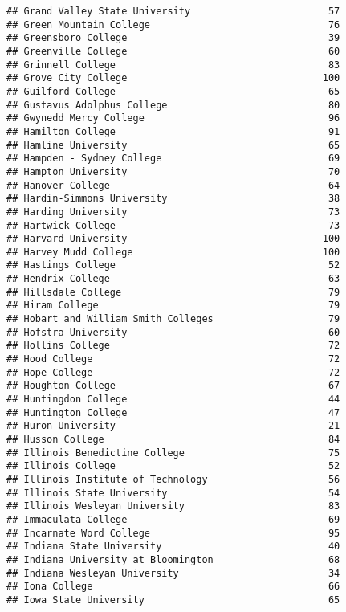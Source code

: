 \documentclass[
]{article}
\begin{document}
\begin{verbatim}
## Grand Valley State University                        57
## Green Mountain College                               76
## Greensboro College                                   39
## Greenville College                                   60
## Grinnell College                                     83
## Grove City College                                  100
## Guilford College                                     65
## Gustavus Adolphus College                            80
## Gwynedd Mercy College                                96
## Hamilton College                                     91
## Hamline University                                   65
## Hampden - Sydney College                             69
## Hampton University                                   70
## Hanover College                                      64
## Hardin-Simmons University                            38
## Harding University                                   73
## Hartwick College                                     73
## Harvard University                                  100
## Harvey Mudd College                                 100
## Hastings College                                     52
## Hendrix College                                      63
## Hillsdale College                                    79
## Hiram College                                        79
## Hobart and William Smith Colleges                    79
## Hofstra University                                   60
## Hollins College                                      72
## Hood College                                         72
## Hope College                                         72
## Houghton College                                     67
## Huntingdon College                                   44
## Huntington College                                   47
## Huron University                                     21
## Husson College                                       84
## Illinois Benedictine College                         75
## Illinois College                                     52
## Illinois Institute of Technology                     56
## Illinois State University                            54
## Illinois Wesleyan University                         83
## Immaculata College                                   69
## Incarnate Word College                               95
## Indiana State University                             40
## Indiana University at Bloomington                    68
## Indiana Wesleyan University                          34
## Iona College                                         66
## Iowa State University                                65

\end{verbatim}
\end{document}
